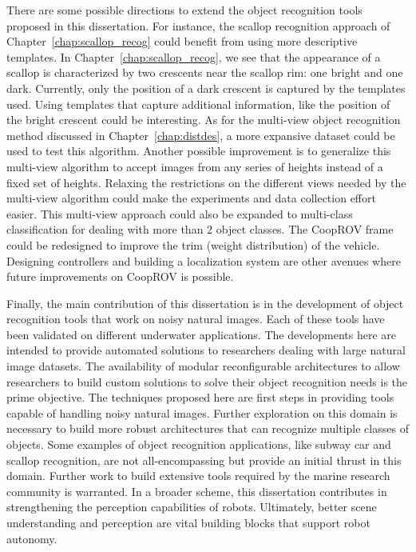 There are some possible directions to extend the object recognition tools proposed in this dissertation. For instance, the scallop recognition approach of Chapter~\ref{chap:scallop_recog} could benefit from using more descriptive 
templates. In Chapter~\ref{chap:scallop_recog}, we see that the appearance of a scallop is characterized by two crescents near the scallop rim: one bright and one dark. Currently, only the position of a dark crescent is captured by the templates used. Using templates that capture additional information, like the position of the bright crescent could be interesting. As for the multi-view object recognition method discussed in Chapter~\ref{chap:distdes}, a more expansive dataset could be used to test this algorithm. Another possible improvement is to generalize this multi-view algorithm to accept images from any series of heights instead of a fixed set of heights. Relaxing the restrictions on the different views needed by the multi-view algorithm could make the experiments and data collection effort easier. This multi-view approach could also be expanded to multi-class classification for dealing with more than 2 object classes. The CoopROV frame could be redesigned to improve the trim (weight distribution) of 
the vehicle. Designing controllers and building a localization system are other avenues where future improvements on CoopROV is possible.

Finally, the main contribution of this dissertation is in the development of object recognition tools that work on noisy natural images. Each of these tools have been validated on different underwater applications. The developments here are intended to provide automated solutions to researchers dealing with large natural image datasets.
The availability of modular reconfigurable architectures to allow researchers to build custom solutions to solve their object recognition needs is the prime objective. The techniques proposed here are first steps in providing tools capable of handling noisy natural images. Further exploration on this domain is necessary to build more robust architectures that can recognize multiple classes of objects. Some examples of object recognition applications, like subway car and scallop recognition, are not all-encompassing but provide an initial thrust in this domain. Further work to build extensive tools required by the marine research community is warranted. In a broader scheme, this dissertation contributes in strengthening the perception capabilities of robots. Ultimately, better scene understanding and perception are vital building blocks that support robot autonomy.

